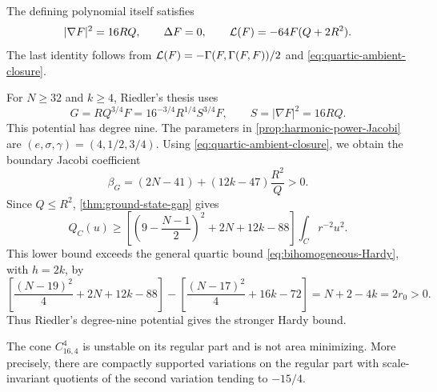 The defining polynomial itself satisfies
\[
 |\nabla F|^2=16RQ,\qquad \Delta F=0,\qquad
 \mathcal L(F)=-64F(Q+2R^2).
\]
The last identity follows from
$\mathcal L(F)=-\Gamma(F,\Gamma(F,F))/2$ and
\eqref{eq:quartic-ambient-closure}.

\begin{example}
\label{ex:Riedler-correct-power}
For \(N\geq32\) and \(k\geq4\), Riedler's thesis uses
\cite[Section~5.2.2, Lemmas~5.2.12--5.2.13]{RiedlerThesis25}
\begin{equation}\label{eq:Riedler-correct-potential}
 G=RQ^{3/4}F=16^{-3/4}R^{1/4}S^{3/4}F,
 \qquad S=|\nabla F|^2=16RQ.
\end{equation}
This potential has degree nine. The parameters in
\cref{prop:harmonic-power-Jacobi} are
\((e,\sigma,\gamma)=(4,1/2,3/4)\).
Using \eqref{eq:quartic-ambient-closure}, we obtain the boundary Jacobi coefficient
\begin{equation}\label{eq:Riedler-positive-boundary}
 \beta_G=(2N-41)+(12k-47)\frac{R^2}{Q}>0.
\end{equation}
Since \(Q\leq R^2\), \cref{thm:ground-state-gap} gives
\[
 Q_C(u)\geq
 \left[\left(9-\frac{N-1}{2}\right)^2+2N+12k-88\right]
 \int_Cr^{-2}u^2.
\]
This lower bound exceeds the general quartic bound
\eqref{eq:bihomogeneous-Hardy}, with $h=2k$, by
\[
 \left[\frac{(N-19)^2}{4}+2N+12k-88\right]
 -\left[\frac{(N-17)^2}{4}+16k-72\right]
 =N+2-4k=2r_0>0.
\]
Thus Riedler's degree-nine potential gives the stronger Hardy bound.
\end{example}

\begin{corollary}
\label{thm:Riedler-unstable}
The cone $C^4_{16,4}$ is unstable on its regular part and is not area
minimizing. More precisely, there are compactly supported variations on the regular
part with scale-invariant quotients of the second variation tending to
$-15/4$.
\end{corollary}

